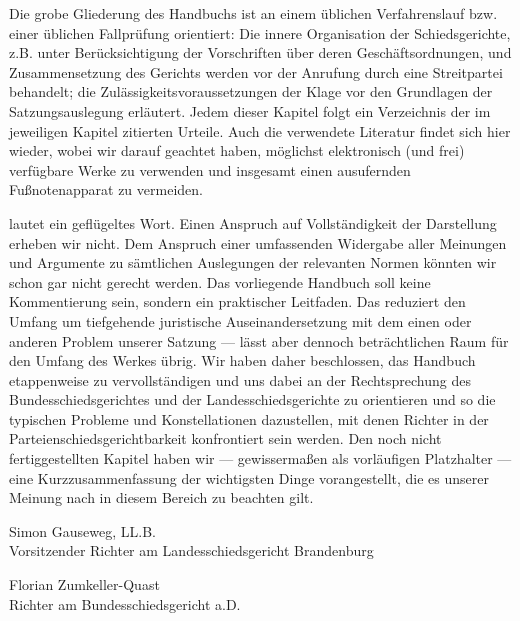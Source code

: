 Die grobe Gliederung des Handbuchs ist an einem üblichen Verfahrenslauf bzw. einer üblichen Fallprüfung orientiert:
Die innere Organisation der Schiedsgerichte, z.B. unter Berücksichtigung der Vorschriften über deren Geschäftsordnungen, und Zusammensetzung des Gerichts werden vor der Anrufung durch eine Streitpartei behandelt; die Zulässigkeitsvoraussetzungen der Klage vor den Grundlagen der Satzungsauslegung erläutert.
Jedem dieser Kapitel folgt ein Verzeichnis der im jeweiligen Kapitel zitierten Urteile.
Auch die verwendete Literatur findet sich hier wieder, wobei wir darauf geachtet haben, möglichst elektronisch (und frei) verfügbare Werke zu verwenden und insgesamt einen ausufernden Fußnotenapparat zu vermeiden.

 lautet ein geflügeltes Wort.
Einen Anspruch auf Vollständigkeit der Darstellung erheben wir nicht.
Dem Anspruch einer umfassenden Widergabe aller Meinungen und Argumente zu sämtlichen Auslegungen der relevanten Normen könnten wir schon gar nicht gerecht werden.
Das vorliegende Handbuch soll keine Kommentierung sein, sondern ein praktischer Leitfaden.
Das reduziert den Umfang um tiefgehende juristische Auseinandersetzung mit dem einen oder anderen Problem unserer Satzung --- lässt aber dennoch beträchtlichen Raum für den Umfang des Werkes übrig.
Wir haben daher beschlossen, das Handbuch etappenweise zu vervollständigen und uns dabei an der Rechtsprechung des Bundesschiedsgerichtes und der Landesschiedsgerichte zu orientieren und so die typischen Probleme und Konstellationen dazustellen, mit denen Richter in der Parteienschiedsgerichtbarkeit konfrontiert sein werden.
Den noch nicht fertiggestellten Kapitel haben wir --- gewissermaßen als vorläufigen Platzhalter --- eine Kurzzusammenfassung der wichtigsten Dinge vorangestellt, die es unserer Meinung nach in diesem Bereich zu beachten gilt.


\vspace{20mm}

Simon Gauseweg, LL.B.\\
Vorsitzender Richter am Landesschiedsgericht Brandenburg

\vspace{5mm}

Florian Zumkeller-Quast\\
Richter am Bundesschiedsgericht a.D.


 
